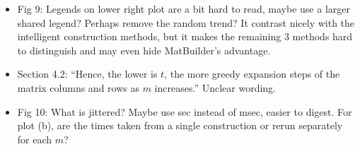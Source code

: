 \documentclass{article}[12pt]
\begin{document}
\begin{itemize}
    \item Fig 9: Legends on lower right plot are a bit hard to read, maybe use a larger shared legend? Perhaps remove the random trend? It contrast nicely with the intelligent construction methods, but it makes the remaining 3 methods hard to distinguish and may even hide MatBuilder's advantage. 
    \item Section 4.2: ``Hence, the lower is $t$, the more greedy expansion steps of the matrix columns and rows as $m$ increases.'' Unclear wording. 
    \item Fig 10: What is jittered? Maybe use sec instead of msec, easier to digest. For plot (b), are the times taken from a single construction or rerun separately for each $m$? 
\end{itemize}
\end{document}
